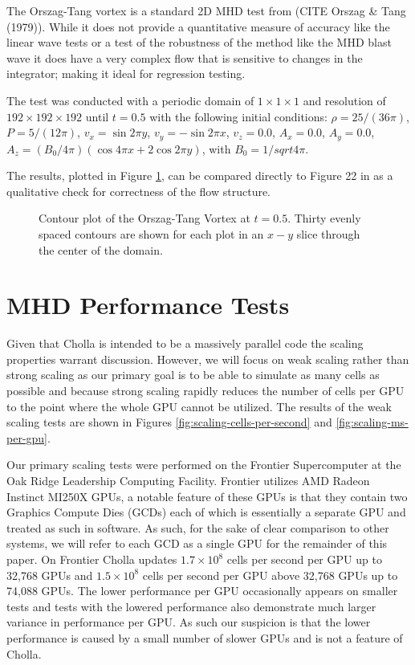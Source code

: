 The Orszag-Tang vortex is a standard 2D MHD test from (CITE Orszag \& Tang (1979)). While it does not provide a quantitative measure of accuracy like the linear wave tests or a test of the robustness of the method like the MHD blast wave it does have a very complex flow that is sensitive to changes in the integrator; making it ideal for regression testing.

The test was conducted with a periodic domain of $1\times1\times1$ and resolution of $192\times192\times192$ until $t = 0.5$ with the following initial conditions: 
$\rho = 25 / \left( 36 \pi \right)$,
$P    =  5 / \left( 12 \pi \right)$,
$v_x  = \sin 2\pi y$,
$v_y  = -\sin 2\pi x$,
$v_z  = 0.0$,
$A_x  = 0.0$,
$A_y  = 0.0$,
$A_z  = \left( B_0/4\pi \right) \left( \cos{4\pi x} + 2 \cos{2\pi y} \right)$, with $B_0 = 1/sqrt{4\pi}$.

The results, plotted in Figure \ref{fig:otv}, can be compared directly to Figure 22 in \cite{stone_athena_2008} as a qualitative check for correctness of the flow structure.

\begin{figure}[ht!]
    \caption{Contour plot of the Orszag-Tang Vortex at $t=0.5$. Thirty evenly spaced contours are shown for each plot in an $x-y$ slice through the center of the domain.  }
    \label{fig:otv}
\end{figure}

\section{MHD Performance Tests}
\label{sec:mhd-perf-tests}

Given that Cholla is intended to be a massively parallel code the scaling properties warrant discussion. However, we will focus on weak scaling rather than strong scaling as our primary goal is to be able to simulate as many cells as possible and because strong scaling rapidly reduces the number of cells per GPU to the point where the whole GPU cannot be utilized. The results of the weak scaling tests are shown in Figures \ref{fig:scaling-cells-per-second} and \ref{fig:scaling-ms-per-gpu}. 

Our primary scaling tests were performed on the Frontier Supercomputer at the Oak Ridge Leadership Computing Facility. Frontier utilizes AMD Radeon Instinct MI250X GPUs, a notable feature of these GPUs is that they contain two Graphics Compute Dies (GCDs) each of which is essentially a separate GPU and treated as such in software. As such, for the sake of clear comparison to other systems, we will refer to each GCD as a single GPU for the remainder of this paper. On Frontier Cholla updates $1.7\times 10^8$ cells per second per GPU up to 32,768 GPUs and $1.5\times 10^8$ cells per second per GPU above 32,768 GPUs up to 74,088 GPUs. The lower performance per GPU occasionally appears on smaller tests and tests with the lowered performance also demonstrate much larger variance in performance per GPU. As such our suspicion is that the lower performance is caused by a small number of slower GPUs and is not a feature of Cholla.

